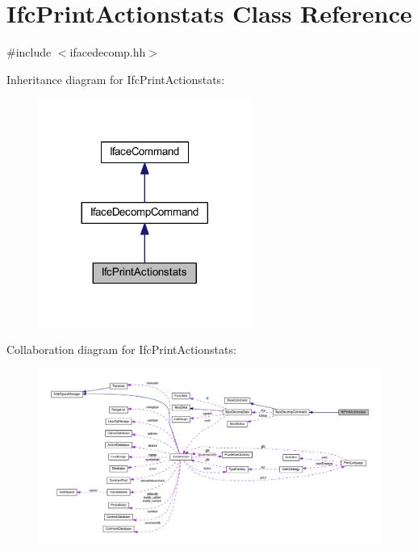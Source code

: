 \hypertarget{class_ifc_print_actionstats}{}\section{Ifc\+Print\+Actionstats Class Reference}
\label{class_ifc_print_actionstats}


{\ttfamily \#include $<$ifacedecomp.\+hh$>$}



Inheritance diagram for Ifc\+Print\+Actionstats\+:
\nopagebreak
\begin{figure}[H]
\begin{center}
\leavevmode
\includegraphics[width=197pt]{class_ifc_print_actionstats__inherit__graph}
\end{center}
\end{figure}


Collaboration diagram for Ifc\+Print\+Actionstats\+:
\nopagebreak
\begin{figure}[H]
\begin{center}
\leavevmode
\includegraphics[width=350pt]{class_ifc_print_actionstats__coll__graph}
\end{center}
\end{figure}
